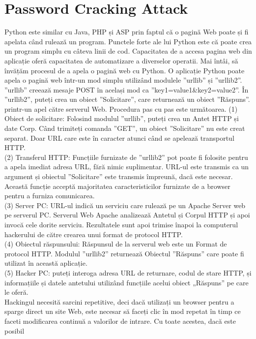 \documentclass[oneside,20pt]{article}          %
\begin{document}
\section{Password Cracking Attack}
Python este similar cu Java, PHP și ASP prin faptul că o pagină Web poate și
fi apelata când rulează un program. Punctele forte ale lui Python este că poate
crea un program simplu cu câteva linii de cod. Capacitatea de a accesa
pagina web din aplicație oferă capacitatea de automatizare
a diverselor operatii. Mai întâi, să învățăm procesul de a apela o pagină web
cu Python.
O aplicație Python poate apela o pagină web într-un mod simplu utilizând
modulele ”urllib” și ”urllib2”. ”urllib” creează mesaje POST
în același mod ca ”key1=value1&key2=value2”. În ”urllib2”,
puteți crea un obiect ”Solicitare”, care returnează un obiect ”Răspuns”.
printr-un apel către serverul Web. Procedura pas cu pas este următoarea.
(1) Obiect de solicitare: Folosind modulul ”urllib”, puteți crea un
Antet HTTP și date Corp. Când trimiteți comanda ”GET”, un obiect ”Solicitare” nu este creat separat. Doar
URL care este în caracter atunci când se apelează transportul HTTP.\\
(2) Transferul HTTP: Funcțiile furnizate de ”urllib2” pot
poate fi folosite pentru a apela imediat adresa URL, fără nimic suplimentar. URL-ul este transmis ca un
argument și obiectul ”Solicitare” este transmis împreună, dacă este necesar.
Această funcție acceptă majoritatea caracteristicilor furnizate de a
browser pentru a furniza comunicarea.\\
(3) Server PC: URL-ul indică un serviciu care rulează pe un Apache
Server web pe serverul PC. Serverul Web Apache analizează
Antetul și Corpul HTTP și apoi invocă cele dorite
serviciu. Rezultatele sunt apoi trimise înapoi la computerul hackerului de către
crearea unui format de protocol HTTP.\\
(4) Obiectul răspunsului: Răspunsul de la serverul web este un
Format de protocol HTTP. Modulul ”urllib2” returnează
Obiectul ”Răspuns” care poate fi utilizat în această aplicație.\\
(5) Hacker PC: puteți interoga adresa URL de returnare, codul de stare HTTP,
și informațiile și datele antetului utilizând funcțiile acelui obiect „Răspuns” pe care le oferă.\\
Hackingul necesită sarcini repetitive, deci dacă utilizați un browser
pentru a sparge direct un site Web, este necesar să faceți clic în mod repetat în timp ce faceti
modificarea continuă a valorilor de intrare. Cu toate acestea, dacă este posibil
\end{document}
